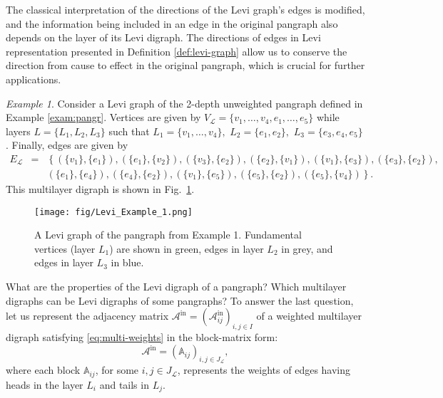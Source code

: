 \documentclass[a4paper,12pt]{article}
\theoremstyle{definition}
\theoremstyle{remark}
\newtheorem{exam}{Example}
\newcommand{\mL}{\mathcal{L}}
\newcommand{\tin}{\mathrm{in}}
\begin{document}
The classical interpretation of the directions of the Levi graph's edges is modified, and the information being included in an edge in the original pangraph also depends on the layer of its Levi digraph. The directions of edges in Levi representation presented in Definition \ref{def:levi-graph} allow us to conserve the direction from cause to effect in the original pangraph, which is crucial for further applications.

\begin{exam}
    Consider a Levi graph of the 2-depth unweighted pangraph defined in Example \ref{exam:pangr}. Vertices are given by $V_{\mathcal{L}}=\{v_1,\ldots,v_4,e_1,\ldots,e_5\}$ while layers $L=\{L_1,L_2,L_3\}$ such that $L_1=\{v_1,\ldots, v_4\},$ $L_2=\{e_1,e_2\},$ $L_3=\{e_3,e_4, e_5\}$. Finally, edges are given by
\begin{eqnarray*}
E_{\mathcal{L}}&=&\left\{(\{v_1\},\{e_1\}), (\{e_1\},\{v_2\}), (\{v_3\},\{e_2\}),(\{e_2\},\{v_1\}), (\{v_1\},\{e_3\}), (\{e_3\},\{e_2\}),\right.\\
&&\left.(\{e_1\},\{e_4\}),(\{e_4\},\{e_2\}) , (\{v_1\},\{e_5\}), (\{e_5\},\{e_2\}), (\{e_5\},\{v_4\}) \right\}.
\end{eqnarray*}
This multilayer digraph is shown in Fig.~\ref{fig:Levi_example_1}.
\end{exam}


\begin{figure}
    \centering
    \texttt{[image: fig/Levi\_Example\_1.png]}
    \caption{A Levi graph of the pangraph from Example 1. Fundamental vertices (layer $L_1$) are shown in green, edges in layer $L_2$ in grey, and edges in layer $L_3$ in blue.}\label{fig:Levi_example_1}
\end{figure}

What are the properties of the Levi digraph of a pangraph? Which multilayer digraphs can be Levi digraphs of some pangraphs? To answer the last question, let us represent the adjacency matrix $\mathcal{A}^{\tin}=(\mathcal{A}^{\tin}_{ij})_{i,j\in I}$ of a weighted multilayer digraph satisfying \eqref{eq:multi-weights}
in the block-matrix form: 
\begin{equation}\label{eq:adj_block}
\mathcal{A}^{\tin}=(\mathbb{A}_{ij})_{i,j\in J_{\mL}},
\end{equation}
where each block $\mathbb{A}_{ij}$, for some $i,j\in J_{\mL}$, represents the weights of edges having heads in the layer $L_i$ and tails in $L_j$.  
\end{document}
